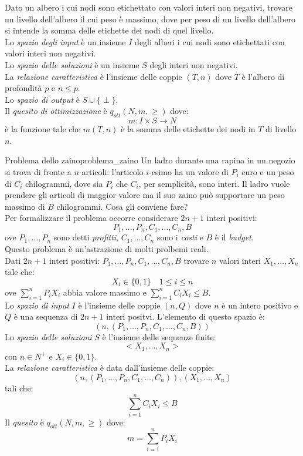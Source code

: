 \documentclass[12pt]{report}
\newcommand{\nmu}{}
\begin{document}
   	\begin{example}{}{}
   		Dato un albero i cui nodi sono etichettato con valori interi non negativi, trovare un livello dell'albero il cui peso è massimo, dove per peso di un livello dell'albero si intende la somma delle etichette dei nodi di quel livello. \\
   		Lo \textit{spazio degli input} è un insieme $I$ degli alberi i cui nodi sono etichettati con valori interi non negativi. \\
   		Lo \textit{spazio delle soluzioni} è un insieme $S$ degli interi non negativi. \\
   		La \textit{relazione caratteristica} è l'insieme delle coppie $(T, n)$ dove $T$ è l'albero di profondità $p$ e $n \leq p$. \\
   		Lo \textit{spazio di output} è $S \cup \{\perp\}$. \\
   		Il \textit{quesito di ottimizzazione} è $q_{ott}(N, m, \geq)$ dove:
   		\[
   		m: I \times S \to N
   		\]
   		è la funzione tale che $m(T, n)$ è la somma delle etichette dei nodi in $T$ di livello $n$.
   	\end{example}
   	\begin{example}{\nmu Problema dello zaino}{problema_zaino}
   		Un ladro durante una rapina in un negozio si trova di fronte a $n$ articoli: l'articolo $i$-esimo ha un valore di $P_i$ euro e un peso di $C_i$ chilogrammi, dove sia $P_i$ che $C_i$, per semplicità, sono interi. Il ladro vuole prendere gli articoli di maggior valore ma il suo zaino può supportare un peso massimo di $B$ chilogrammi. Cosa gli conviene fare? \\
   		Per formalizzare il problema occorre considerare $2n + 1$ interi positivi:
   		\[
   		P_1, \dots, P_n, C_1, \dots, C_n, B
   		\]
   		ove $P_1, \dots, P_n$ sono detti \textit{profitti}, $C_1, \dots, C_n$ sono i \textit{costi} e $B$ è il \textit{budget}. \\
   		Questo problema è un'astrazione di molti prolbemi reali. \\
   		Dati $2n + 1$ interi  positivi: $P_1, \dots, P_n, C_1, \dots, C_n, B$ trovare  $n$ valori interi $X_1, \dots, X_n$ tale che:
   		\[
   		X_{i} \in \{0, 1\} \quad 1 \leq i \leq n
   		\]
   		ove $\sum_{i=1}^{n}P_iX_i$ abbia valore massimo e $\sum_{i=1}^{n}C_iX_i \leq B$. \\
   		Lo \textit{spazio di input} $I$ è l'insieme delle coppie $(n, Q)$ dove $n$ è un intero positivo e $Q$ è una sequenza di $2n + 1$ interi positvi. L'elemento di questo spazio è:
   		\[
   		(n, (P_1, \dots, P_n, C_1, \dots, C_n, B))
   		\]
   		Lo \textit{spazio delle soluzioni} $S$ è l'insieme delle sequenze finite:
   		\[
   		<X_1, \dots, X_n>
   		\]
   		con $n \in N^+$ e $X_i \in \{0, 1\}$. \\
   		La \textit{relazione caratteristica} è data dall'insieme delle coppie:
   		\[
   		(n, (P_1, \dots, P_n, C_1, \dots, C_n)), (X_1, \dots, X_n)
   		\]
   		tali che:
   		\[
   		\sum_{i=1}^{n}C_iX_i \leq B
   		\]
   		Il \textit{quesito} è $q_{ott}(N, m, \geq)$ dove:
   		\[
   		m = \sum_{i=1}^{n}P_iX_i
   		\]
   	\end{example}
\end{document}
